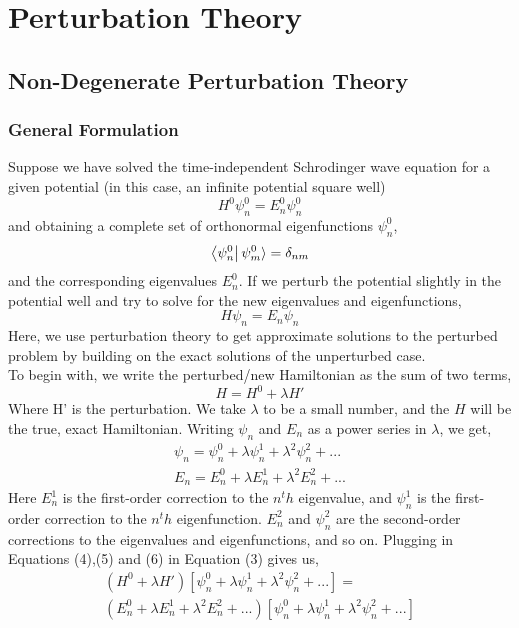 \chapter{Perturbation Theory}
\section{Non-Degenerate Perturbation Theory}
\subsection{General Formulation}
Suppose we have solved the time-independent Schrodinger wave equation for a given potential (in this case, an infinite potential square well)
\begin{equation}
H^0\psi_{n}^0=E^{0}_{n}\psi_{n}^0
\end{equation}
and obtaining a complete set of orthonormal eigenfunctions $\psi_{n}^0$,
\begin{equation}
\bra{\psi_{n}^0}{\psi_{m}^0}\rangle=\delta_{nm}
\end{equation}
and the corresponding eigenvalues $E^0_n$. If we perturb the potential slightly in the potential well and try to solve for the new eigenvalues and eigenfunctions, 
\begin{equation}
H\psi_n=E_n\psi_n
\end{equation}
Here, we use perturbation theory to get approximate solutions to the perturbed problem by building on the exact solutions of the unperturbed case.\\
To begin with, we write the perturbed/new Hamiltonian as the sum of two terms,
\begin{equation}
H=H^0+\lambda H'
\end{equation}
Where H' is the perturbation. We take $\lambda$ to be a small number, and the $H$ will be the true, exact Hamiltonian. Writing $\psi_n$ and $E_n$ as a power series in $\lambda$, we get,
\begin{gather}
\psi_{n}=\psi_{n}^0 + \lambda \psi_{n}^1 + \lambda^2 \psi_{n}^2+... \\
E_n= E^0_n + \lambda E^1_n + \lambda^2 E^2_n+...
\end{gather}
Here $E^1_n$ is the first-order correction to the $n^th$ eigenvalue, and $\psi_{n}^1$ is the first-order correction to the $n^th$ eigenfunction. $E^2_n$ and $\psi_{n}^2$ are the second-order corrections to the eigenvalues and eigenfunctions, and so on. Plugging in Equations (4),(5) and (6) in Equation (3) gives us,
\begin{multline}
(H^0+\lambda H')[\psi_{n}^0 + \lambda \psi_{n}^1 + \lambda^2 \psi_{n}^2+... ]=\\( E^0_n + \lambda E^1_n + \lambda^2 E^2_n+...)[\psi_{n}^0 + \lambda \psi_{n}^1 + \lambda^2 \psi_{n}^2+...]
\end{multline}
